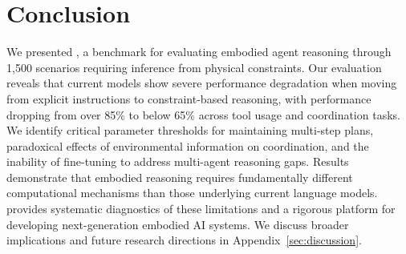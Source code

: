 \section{Conclusion}
We presented \framework, a benchmark for evaluating embodied agent reasoning through 1,500 scenarios requiring inference from physical constraints. Our evaluation reveals that current models show severe performance degradation when moving from explicit instructions to constraint-based reasoning, with performance dropping from over 85\% to below 65\% across tool usage and coordination tasks. We identify critical parameter thresholds for maintaining multi-step plans, paradoxical effects of environmental information on coordination, and the inability of fine-tuning to address multi-agent reasoning gaps. Results demonstrate that embodied reasoning requires fundamentally different computational mechanisms than those underlying current language models. \framework provides systematic diagnostics of these limitations and a rigorous platform for developing next-generation embodied AI systems. We discuss broader implications and future research directions in Appendix~\ref{sec:discussion}.
